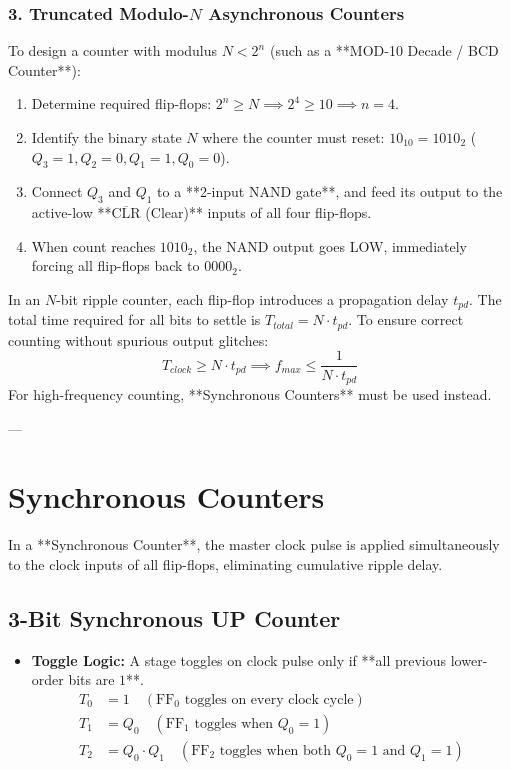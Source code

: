\subsubsection{3. Truncated Modulo-$N$ Asynchronous Counters}
To design a counter with modulus $N < 2^n$ (such as a **MOD-10 Decade / BCD Counter**):
\begin{enumerate}
    \item Determine required flip-flops: $2^n \ge N \implies 2^4 \ge 10 \implies n = 4$.
    \item Identify the binary state $N$ where the counter must reset: $10_{10} = 1010_2$ ($Q_3 = 1, Q_2 = 0, Q_1 = 1, Q_0 = 0$).
    \item Connect $Q_3$ and $Q_1$ to a **2-input NAND gate**, and feed its output to the active-low **$\overline{\text{CLR}}$ (Clear)** inputs of all four flip-flops.
    \item When count reaches $1010_2$, the NAND output goes LOW, immediately forcing all flip-flops back to $0000_2$.
\end{enumerate}

\begin{commonmistake}
In an $N$-bit ripple counter, each flip-flop introduces a propagation delay $t_{pd}$. The total time required for all bits to settle is $T_{total} = N \cdot t_{pd}$. To ensure correct counting without spurious output glitches:
\begin{equation}
    T_{clock} \ge N \cdot t_{pd} \implies f_{max} \le \frac{1}{N \cdot t_{pd}}
\end{equation}
For high-frequency counting, **Synchronous Counters** must be used instead.
\end{commonmistake}

---

\section{Synchronous Counters}
In a **Synchronous Counter**, the master clock pulse is applied simultaneously to the clock inputs of all flip-flops, eliminating cumulative ripple delay.

\subsection{3-Bit Synchronous UP Counter}
\begin{itemize}
    \item \textbf{Toggle Logic:} A stage toggles on clock pulse only if **all previous lower-order bits are $1$**.
    \begin{align*}
        T_0 &= 1 \quad (\text{FF}_0 \text{ toggles on every clock cycle}) \\
        T_1 &= Q_0 \quad (\text{FF}_1 \text{ toggles when } Q_0 = 1) \\
        T_2 &= Q_0 \cdot Q_1 \quad (\text{FF}_2 \text{ toggles when both } Q_0 = 1 \text{ and } Q_1 = 1)
    \end{align*}
\end{itemize}

